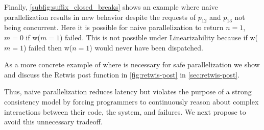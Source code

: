 Finally, \cref{subfig:suffix_closed_breaks} shows an example where naive parallelization results in new behavior despite the requests of $p_{12}$ and $p_{13}$ not being concurrent. Here it is possible for naive parallelization to return $n=1$, $m=0$ if w($m=1$) failed. This is not possible under Linearizability because if w($m=1$) failed then w($n=1$) would never have been dispatched.

As a more concrete example of where \mdl{} is necessary for safe parallelization we show and discuss the Retwis post function in 
\cref{fig:retwis-post} in \cref{sec:retwis-post}.

Thus, naive parallelization reduces latency but violates the purpose of a strong consistency model by forcing programmers to continuously reason about complex interactions between their code, the system, and failures. We next propose \mdl{} to avoid this unnecessary tradeoff.





